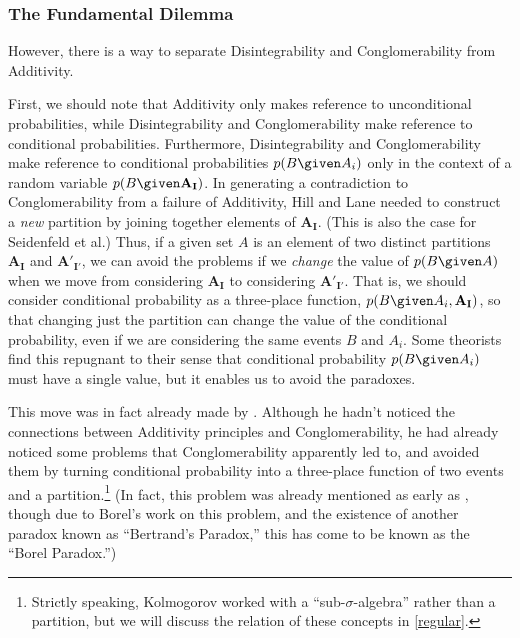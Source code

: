 \subsubsection{The Fundamental Dilemma}\label{dilemma}

However, there is a way to separate Disintegrability and Conglomerability from Additivity.

First, we should note that Additivity only makes reference to unconditional probabilities, while Disintegrability and Conglomerability make reference to conditional probabilities. Furthermore, Disintegrability and Conglomerability make reference to conditional probabilities $p(B \given A_i)$ only in the context of a random variable $p(B \given \mathbf{A_I})$. In generating a contradiction to Conglomerability from a failure of Additivity, Hill and Lane needed to construct a \emph{new} partition by joining together elements of $\mathbf{A_I}$. (This is also the case for Seidenfeld et al.) Thus, if a given set $A$ is an element of two distinct partitions $\mathbf{A_I}$ and $\mathbf{A'_{I'}}$, we can avoid the problems if we \emph{change} the value of $p(B \given A)$ when we move from considering $\mathbf{A_I}$ to considering $\mathbf{A'_{I'}}$. That is, we should consider conditional probability as a three-place function, $p(B \given A_i,\mathbf{A_I})$, so that changing just the partition can change the value of the conditional probability, even if we are considering the same events $B$ and $A_i$. Some theorists find this repugnant to their sense that conditional probability $p(B \given A_i)$ must have a single value, but it enables us to avoid the paradoxes.

This move was in fact already made by \citet{kolmogorov}. Although he hadn't noticed the connections between Additivity principles and Conglomerability, he had already noticed some problems that Conglomerability apparently led to, and avoided them by turning conditional probability into a three-place function of two events and a partition.\footnote{Strictly speaking, Kolmogorov worked with a ``sub-$\sigma$-algebra'' rather than a partition, but we will discuss the relation of these concepts in \autoref{regular}.} (In fact, this problem was already mentioned as early as \citealp{bertrand}, though due to Borel's work on this problem, and the existence of another paradox known as ``Bertrand's Paradox,'' this has come to be known as the ``Borel Paradox.'')


